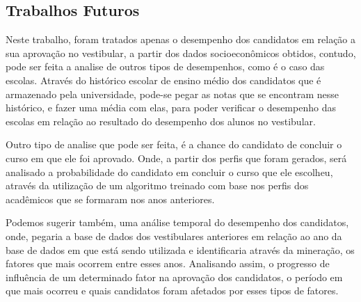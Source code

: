 \subsection{Trabalhos Futuros}

\par
Neste trabalho, foram tratados apenas o desempenho dos candidatos em relação a sua aprovação no vestibular, a partir dos dados socioeconômicos obtidos, contudo, pode ser feita a analise de outros tipos de desempenhos, como é o caso das escolas. Através do histórico escolar de ensino médio dos candidatos que é armazenado pela universidade, pode-se pegar as notas que se encontram nesse histórico, e fazer uma média com elas, para poder verificar o desempenho das escolas em relação ao resultado do desempenho dos alunos no vestibular. 

\par
Outro tipo de analise que pode ser feita, é a chance do candidato de concluir o curso em que ele foi aprovado. Onde, a partir dos perfis que foram gerados, será analisado a probabilidade do candidato em concluir o curso que ele escolheu, através da utilização de um algoritmo treinado com base nos perfis dos acadêmicos que se formaram nos anos anteriores.

\par
Podemos sugerir também, uma análise temporal do desempenho dos candidatos, onde, pegaria a base de dados dos vestibulares anteriores em relação ao ano da base de dados em que está sendo utilizada e identificaria através da mineração, os fatores que mais ocorrem entre esses anos. Analisando assim, o progresso de influência de um determinado fator na aprovação dos candidatos, o período em que mais ocorreu e quais candidatos foram afetados por esses tipos de fatores.
